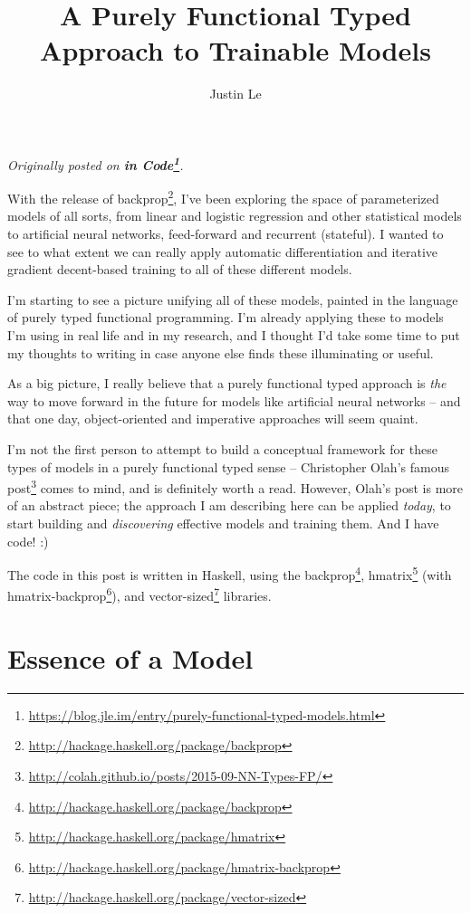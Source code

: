 \documentclass[]{article}
\title{A Purely Functional Typed Approach to Trainable Models}
\author{Justin Le}
\renewcommand{\href}[2]{#2\footnote{\url{#1}}}
\begin{document}
\maketitle

\emph{Originally posted on
\textbf{\href{https://blog.jle.im/entry/purely-functional-typed-models.html}{in
Code}}.}

With the release of
\href{http://hackage.haskell.org/package/backprop}{backprop}, I've been
exploring the space of parameterized models of all sorts, from linear and
logistic regression and other statistical models to artificial neural networks,
feed-forward and recurrent (stateful). I wanted to see to what extent we can
really apply automatic differentiation and iterative gradient decent-based
training to all of these different models.

I'm starting to see a picture unifying all of these models, painted in the
language of purely typed functional programming. I'm already applying these to
models I'm using in real life and in my research, and I thought I'd take some
time to put my thoughts to writing in case anyone else finds these illuminating
or useful.

As a big picture, I really believe that a purely functional typed approach is
\emph{the} way to move forward in the future for models like artificial neural
networks -- and that one day, object-oriented and imperative approaches will
seem quaint.

I'm not the first person to attempt to build a conceptual framework for these
types of models in a purely functional typed sense --
\href{http://colah.github.io/posts/2015-09-NN-Types-FP/}{Christopher Olah's
famous post} comes to mind, and is definitely worth a read. However, Olah's post
is more of an abstract piece; the approach I am describing here can be applied
\emph{today}, to start building and \emph{discovering} effective models and
training them. And I have code! :)

The code in this post is written in Haskell, using the
\href{http://hackage.haskell.org/package/backprop}{backprop},
\href{http://hackage.haskell.org/package/hmatrix}{hmatrix} (with
\href{http://hackage.haskell.org/package/hmatrix-backprop}{hmatrix-backprop}),
and \href{http://hackage.haskell.org/package/vector-sized}{vector-sized}
libraries.

\hypertarget{essence-of-a-model}{%
\section{Essence of a Model}\label{essence-of-a-model}}
\end{document}
